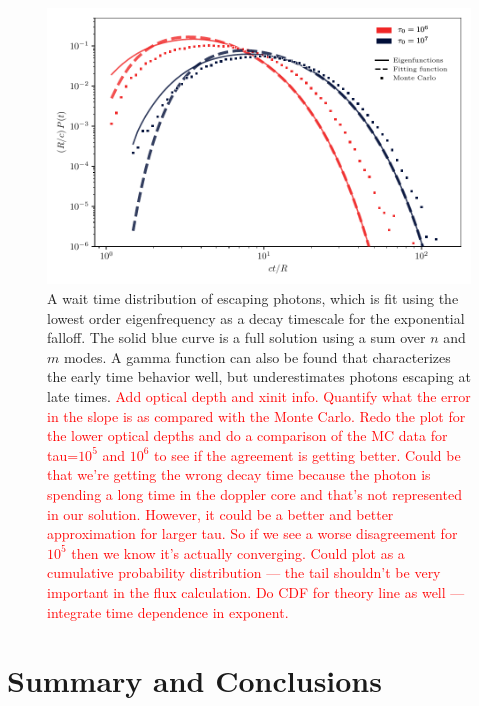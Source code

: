 \documentclass{aastex63}
\newcommand{\todo}[1]{\textcolor{red}{#1}}
\begin{document}
\begin{figure}
    \centering
    \includegraphics{waittime.pdf}
    \caption{A wait time distribution of escaping photons, which is fit using the lowest order eigenfrequency as a decay timescale for the exponential falloff. The solid blue curve is a full solution using a sum over $n$ and $m$ modes. A gamma function can also be found that characterizes the early time behavior well, but underestimates photons escaping at late times. \todo{Add optical depth and xinit info. Quantify what the error in the slope is as compared with the Monte Carlo. Redo the plot for the lower optical depths and do a comparison of the MC data for tau=$10^5$ and $10^6$ to see if the agreement is getting better. Could be that we're getting the wrong decay time because the photon is spending a long time in the doppler core and that's not represented in our solution. However, it could be a better and better approximation for larger tau. So if we see a worse disagreement for $10^5$ then we know it's actually converging. Could plot as a cumulative probability distribution --- the tail shouldn't be very important in the flux calculation. Do CDF for theory line as well --- integrate time dependence in exponent.}}
    \label{fig:escape_time}
\end{figure}

\section{Summary and Conclusions}
\end{document}
